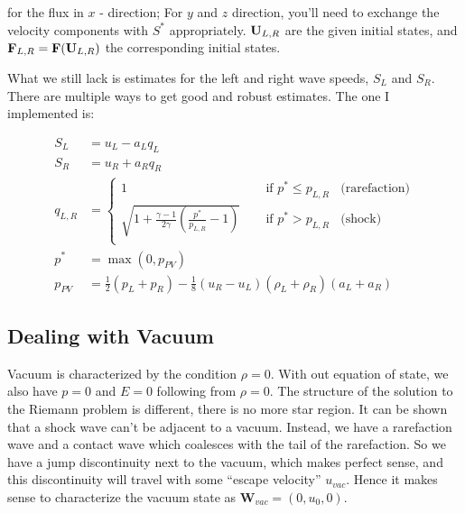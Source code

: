 for the flux in $x$ - direction;
For $y$ and $z$ direction, you'll need to exchange the velocity components with $S^*$ appropriately.
$\mathbf{U}_{L,R}$ are the given initial states, and $\mathbf{F}_{L,R} = \mathbf{F}(\mathbf{U}_{L,R})$ the corresponding initial states.



What we still lack is estimates for the left and right wave speeds, $S_L$ and $S_R$.
There are multiple ways to get good and robust estimates.
The one I implemented is:

\begin{align}
	S_L  &= u_L - a_L q_L \\
	S_R  &= u_R + a_R q_R \\
	q_{L,R} &= 
		\begin{cases}
			1	~~~~ & \text{ if } p^* \leq p_{L,R} ~~~~ \text{(rarefaction)}\\
			\sqrt{1 + \frac{\gamma - 1}{2 \gamma} \left(\frac{p^*}{p_{L,R}} - 1 \right)}	~~~~ & \text{ if } p^* > p_{L,R} ~~~~ \text{(shock)}\\
		\end{cases} \\
	p^* &= \max(0, p_{PV})\\
	p_{PV} &= \frac{1}{2} (p_L + p_R) - \frac{1}{8} (u_R - u_L)(\rho_L + \rho_R)(a_L + a_R)
\end{align}










\subsection{Dealing with Vacuum}


Vacuum is characterized by the condition $\rho = 0$.
With out equation of state, we also have $p = 0$ and $E = 0$ following from $\rho = 0$.
The structure of the solution to the Riemann problem is different, there is no more star region.
It can be shown that a shock wave can't be adjacent to a vacuum.
Instead, we have a rarefaction wave and a contact wave which coalesces with the tail of the rarefaction.
So we have a jump discontinuity next to the vacuum, which makes perfect sense, and this discontinuity will travel with some ``escape velocity'' $u_{vac}$.
Hence it makes sense to characterize the vacuum state as $\mathbf{W}_{vac} = (0, u_0, 0)$.


